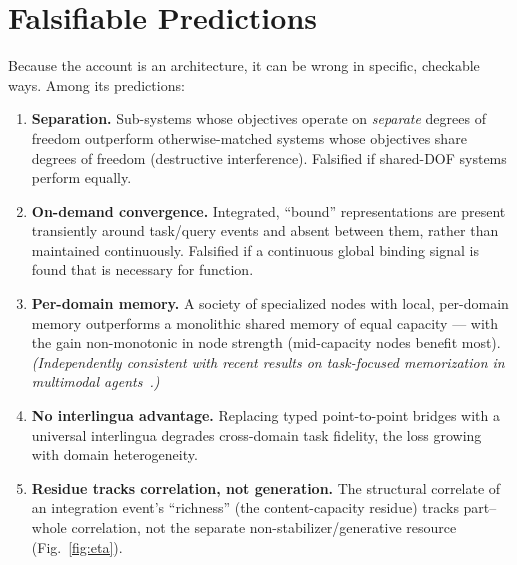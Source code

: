 \documentclass[11pt]{article}
\begin{document}
\section{Falsifiable Predictions}
\label{sec:pred}

Because the account is an architecture, it can be wrong in specific, checkable ways. Among its
predictions:

\begin{enumerate}\itemsep2pt
\item \textbf{Separation.} Sub-systems whose objectives operate on \emph{separate} degrees of freedom
outperform otherwise-matched systems whose objectives share degrees of freedom (destructive
interference). Falsified if shared-DOF systems perform equally.
\item \textbf{On-demand convergence.} Integrated, ``bound'' representations are present transiently
around task/query events and absent between them, rather than maintained continuously. Falsified if a
continuous global binding signal is found that is necessary for function.
\item \textbf{Per-domain memory.} A society of specialized nodes with local, per-domain memory
outperforms a monolithic shared memory of equal capacity --- with the gain non-monotonic in node
strength (mid-capacity nodes benefit most). \emph{(Independently consistent with recent results on
task-focused memorization in multimodal agents~\cite{taskmem2026}.)}
\item \textbf{No interlingua advantage.} Replacing typed point-to-point bridges with a universal
interlingua degrades cross-domain task fidelity, the loss growing with domain heterogeneity.
\item \textbf{Residue tracks correlation, not generation.} The structural correlate of an integration
event's ``richness'' (the content-capacity residue) tracks part--whole correlation, not the separate
non-stabilizer/generative resource (Fig.~\ref{fig:eta}).
\end{enumerate}
\end{document}

